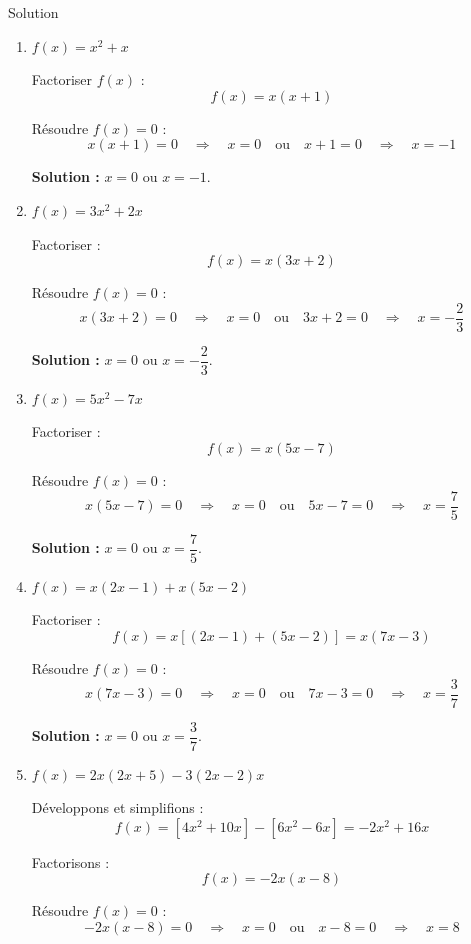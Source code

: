\documentclass[a4paper,12pt]{article}
\begin{document}
\begin{solutionbox}{Solution}
\begin{enumerate}
    \item \( f(x) = x^2 + x \)

    Factoriser \( f(x) \) :
    \[
    f(x) = x(x + 1)
    \]

    Résoudre \( f(x) = 0 \) :
    \[
    x(x + 1) = 0 \quad \Rightarrow \quad x = 0 \quad \text{ou} \quad x + 1 = 0 \quad \Rightarrow \quad x = -1
    \]

    \textbf{Solution :} \( x = 0 \) ou \( x = -1 \).

    \item \( f(x) = 3x^2 + 2x \)

    Factoriser :
    \[
    f(x) = x(3x + 2)
    \]

    Résoudre \( f(x) = 0 \) :
    \[
    x(3x + 2) = 0 \quad \Rightarrow \quad x = 0 \quad \text{ou} \quad 3x + 2 = 0 \quad \Rightarrow \quad x = -\dfrac{2}{3}
    \]

    \textbf{Solution :} \( x = 0 \) ou \( x = -\dfrac{2}{3} \).

    \item \( f(x) = 5x^2 - 7x \)

    Factoriser :
    \[
    f(x) = x(5x - 7)
    \]

    Résoudre \( f(x) = 0 \) :
    \[
    x(5x - 7) = 0 \quad \Rightarrow \quad x = 0 \quad \text{ou} \quad 5x - 7 = 0 \quad \Rightarrow \quad x = \dfrac{7}{5}
    \]

    \textbf{Solution :} \( x = 0 \) ou \( x = \dfrac{7}{5} \).

    \item \( f(x) = x(2x - 1) + x(5x - 2) \)

    Factoriser :
    \[
    f(x) = x[(2x - 1) + (5x - 2)] = x(7x - 3)
    \]

    Résoudre \( f(x) = 0 \) :
    \[
    x(7x - 3) = 0 \quad \Rightarrow \quad x = 0 \quad \text{ou} \quad 7x - 3 = 0 \quad \Rightarrow \quad x = \dfrac{3}{7}
    \]

    \textbf{Solution :} \( x = 0 \) ou \( x = \dfrac{3}{7} \).

    \item \( f(x) = 2x(2x + 5) - 3(2x - 2)x \)

    Développons et simplifions :
    \[
    f(x) = [4x^2 + 10x] - [6x^2 - 6x] = -2x^2 + 16x
    \]

    Factorisons :
    \[
    f(x) = -2x(x - 8)
    \]

    Résoudre \( f(x) = 0 \) :
    \[
    -2x(x - 8) = 0 \quad \Rightarrow \quad x = 0 \quad \text{ou} \quad x - 8 = 0 \quad \Rightarrow \quad x = 8
    \]


\end{enumerate}
\end{solutionbox}
\end{document}
